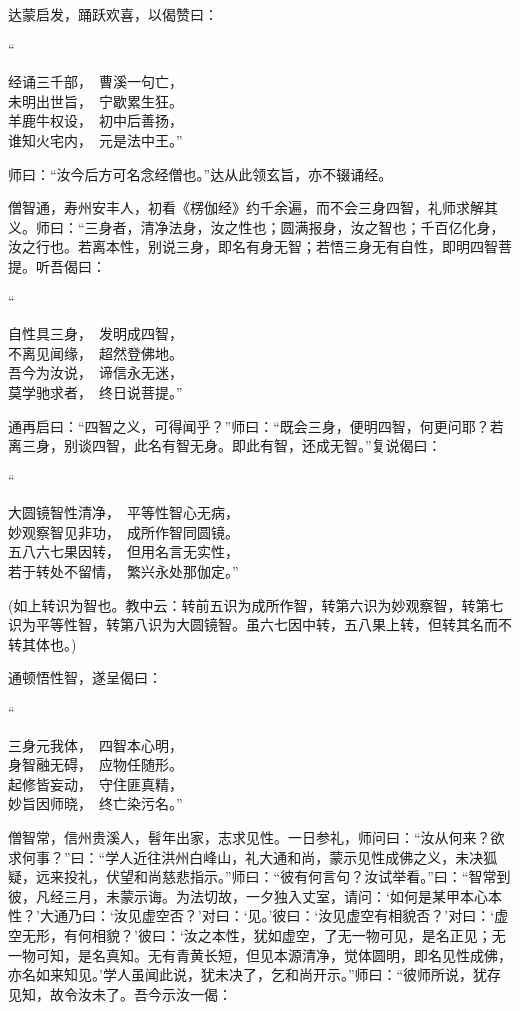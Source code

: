 \documentclass[UTF8, 11pt, oneside]{ctexart}
\newenvironment{jizi}[1]{
    \vspace{-1em}\begin{center}
        #1%
        \begin{varwidth}[t]{\linewidth}
}{
        \end{varwidth}
    \end{center}
}
\begin{document}
达蒙启发，踊跃欢喜，以偈赞曰：

\begin{jizi}{“}
    经诵三千部，　曹溪一句亡， \\
    未明出世旨，　宁歇累生狂。 \\
    羊鹿牛权设，　初中后善扬， \\
    谁知火宅内，　元是法中王。”
\end{jizi}

师曰：“汝今后方可名念经僧也。”达从此领玄旨，亦不辍诵经。

僧智通，寿州安丰人，初看《楞伽经》约千余遍，而不会三身四智，礼师求解其义。师曰：“三身者，清净法身，汝之性也；圆满报身，汝之智也；千百亿化身，汝之行也。若离本性，别说三身，即名有身无智；若悟三身无有自性，即明四智菩提。听吾偈曰：

\begin{jizi}{“}
    自性具三身，　发明成四智， \\
    不离见闻缘，　超然登佛地。 \\
    吾今为汝说，　谛信永无迷， \\
    莫学驰求者，　终日说菩提。”
\end{jizi}

通再启曰：“四智之义，可得闻乎？”师曰：“既会三身，便明四智，何更问耶？若离三身，别谈四智，此名有智无身。即此有智，还成无智。”复说偈曰：

\begin{jizi}{“}
    大圆镜智性清净，　平等性智心无病， \\
    妙观察智见非功，　成所作智同圆镜。 \\
    五八六七果因转，　但用名言无实性， \\
    若于转处不留情，　繁兴永处那伽定。”
\end{jizi}

(如上转识为智也。教中云：转前五识为成所作智，转第六识为妙观察智，转第七识为平等性智，转第八识为大圆镜智。虽六七因中转，五八果上转，但转其名而不转其体也。)

通顿悟性智，遂呈偈曰：

\begin{jizi}{“}
    三身元我体，　四智本心明， \\
    身智融无碍，　应物任随形。 \\
    起修皆妄动，　守住匪真精， \\
    妙旨因师晓，　终亡染污名。”
\end{jizi}

僧智常，信州贵溪人，髫年出家，志求见性。一日参礼，师问曰：“汝从何来？欲求何事？”曰：“学人近往洪州白峰山，礼大通和尚，蒙示见性成佛之义，未决狐疑，远来投礼，伏望和尚慈悲指示。”师曰：“彼有何言句？汝试举看。”曰：“智常到彼，凡经三月，未蒙示诲。为法切故，一夕独入丈室，请问：‘如何是某甲本心本性？’大通乃曰：‘汝见虚空否？’对曰：‘见。’彼曰：‘汝见虚空有相貌否？’对曰：‘虚空无形，有何相貌？’彼曰：‘汝之本性，犹如虚空，了无一物可见，是名正见；无一物可知，是名真知。无有青黄长短，但见本源清净，觉体圆明，即名见性成佛，亦名如来知见。’学人虽闻此说，犹未决了，乞和尚开示。”师曰：“彼师所说，犹存见知，故令汝未了。吾今示汝一偈：
\end{document}
